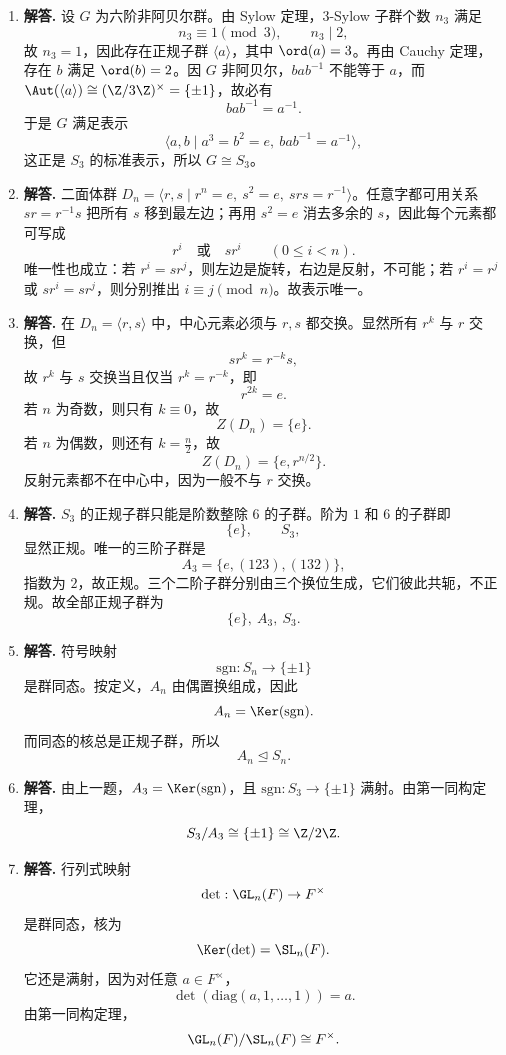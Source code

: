 \begin{enumerate}[label=\textbf{\arabic*.}, leftmargin=*, itemsep=1em]
\item \textbf{解答.} 设 $G$ 为六阶非阿贝尔群。由 Sylow 定理，$3$-Sylow 子群个数 $n_3$ 满足
\[
n_3\equiv1\pmod3,\qquad n_3\mid2,
\]
故 $n_3=1$，因此存在正规子群 $\langle a\rangle$，其中 $\ord(a)=3$。再由 Cauchy 定理，存在 $b$ 满足 $\ord(b)=2$。因 $G$ 非阿贝尔，$bab^{-1}$ 不能等于 $a$，而 $\Aut(\langle a\rangle)\cong (\Z/3\Z)^\times=\{\pm1\}$，故必有
\[
bab^{-1}=a^{-1}.
\]
于是 $G$ 满足表示
\[
\langle a,b\mid a^3=b^2=e,\ bab^{-1}=a^{-1}\rangle,
\]
这正是 $S_3$ 的标准表示，所以 $G\cong S_3$。

\item \textbf{解答.} 二面体群 $D_n=\langle r,s\mid r^n=e,\ s^2=e,\ srs=r^{-1}\rangle$。任意字都可用关系 $sr=r^{-1}s$ 把所有 $s$ 移到最左边；再用 $s^2=e$ 消去多余的 $s$，因此每个元素都可写成
\[
r^i\quad \text{或}\quad sr^i\qquad (0\le i<n).
\]
唯一性也成立：若 $r^i=sr^j$，则左边是旋转，右边是反射，不可能；若 $r^i=r^j$ 或 $sr^i=sr^j$，则分别推出 $i\equiv j\pmod n$。故表示唯一。

\item \textbf{解答.} 在 $D_n=\langle r,s\rangle$ 中，中心元素必须与 $r,s$ 都交换。显然所有 $r^k$ 与 $r$ 交换，但
\[
sr^k=r^{-k}s,
\]
故 $r^k$ 与 $s$ 交换当且仅当 $r^k=r^{-k}$，即
\[
r^{2k}=e.
\]
若 $n$ 为奇数，则只有 $k\equiv0$，故
\[
Z(D_n)=\{e\}.
\]
若 $n$ 为偶数，则还有 $k=\frac n2$，故
\[
Z(D_n)=\{e,r^{n/2}\}.
\]
反射元素都不在中心中，因为一般不与 $r$ 交换。

\item \textbf{解答.} $S_3$ 的正规子群只能是阶数整除 $6$ 的子群。阶为 $1$ 和 $6$ 的子群即
\[
\{e\},\qquad S_3,
\]
显然正规。唯一的三阶子群是
\[
A_3=\{e,(123),(132)\},
\]
指数为 $2$，故正规。三个二阶子群分别由三个换位生成，它们彼此共轭，不正规。故全部正规子群为
\[
\{e\},\ A_3,\ S_3.
\]

\item \textbf{解答.} 符号映射
\[
\mathrm{sgn}:S_n\to\{\pm1\}
\]
是群同态。按定义，$A_n$ 由偶置换组成，因此
\[
A_n=\Ker(\mathrm{sgn}).
\]
而同态的核总是正规子群，所以
\[
A_n\trianglelefteq S_n.
\]

\item \textbf{解答.} 由上一题，$A_3=\Ker(\mathrm{sgn})$，且 $\mathrm{sgn}:S_3\to\{\pm1\}$ 满射。由第一同构定理，
\[
S_3/A_3\cong \{\pm1\}\cong \Z/2\Z.
\]

\item \textbf{解答.} 行列式映射
\[
\det:\GL_n(F)\to F^\times
\]
是群同态，核为
\[
\Ker(\det)=\SL_n(F).
\]
它还是满射，因为对任意 $a\in F^\times$，
\[
\det(\mathrm{diag}(a,1,\dots,1))=a.
\]
由第一同构定理，
\[
\GL_n(F)/\SL_n(F)\cong F^\times.
\]


\end{enumerate}
